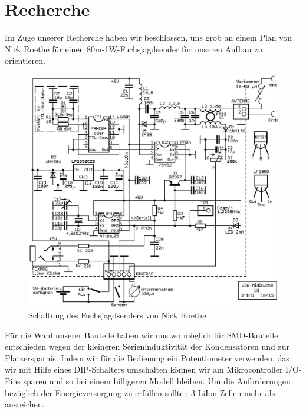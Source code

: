 \section{Recherche}

Im Zuge unserer Recherche haben wir beschlossen, uns grob an einem Plan von Nick Roethe für einen \glqq{}80m-1W-Fuchsjagdsender\grqq{} für unseren Aufbau zu orientieren.\\
\begin{figure}[H]
	\centering
	\includegraphics[width=16cm]{res/Recherche_Aufbau.png}
	\caption{Schaltung des Fuchsjagdsenders von Nick Roethe}
\end{figure}

Für die Wahl unserer Bauteile haben wir uns wo möglich für SMD-Bauteile entschieden wegen der kleineren Serieninduktivität der Kondensatoren und zur Platzersparnis.
Indem wir für die Bedienung ein Potentiometer verwenden, das wir mit Hilfe eines DIP-Schalters umschalten können wir am Mikrocontroller I/O-Pins sparen und so bei einem billigeren Modell bleiben. 
Um die Anforderungen bezüglich der Energieversorgung zu erfüllen sollten 3 LiIon-Zellen mehr als ausreichen.

